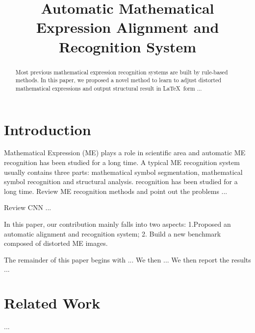 \documentclass[10pt,conference,a4paper]{IEEEtran}
\begin{document}
	\title{Automatic Mathematical Expression Alignment and Recognition System}
	\author{
	}
	\maketitle
	\begin{abstract}
		Most previous mathematical expression recognition systems are built by rule-based methods. In this paper, we proposed a novel method to learn to adjust distorted mathematical expressions and output structural result in \LaTeX\ form ... 
	\end{abstract}
	
	\IEEEpeerreviewmaketitle
	\section{Introduction}
	Mathematical Expression (ME) plays a role in scientific area and automatic ME recognition has been studied for a long time. A typical ME recognition system usually contains three parts: mathematical symbol segmentation, mathematical symbol recognition and structural analysis.
	recognition has been studied for a long time. 
	Review ME recognition methods and point out the problems ...
		
	Review CNN ...
		
	In this paper, our contribution mainly falls into two aspects: 1.Proposed an automatic alignment and recognition system; 2. Build a new benchmark composed of distorted ME images.
		
	The remainder of this paper begins with ... We then ... We then report the results ...
		
	\section{Related Work}
	...
	
\end{document}
